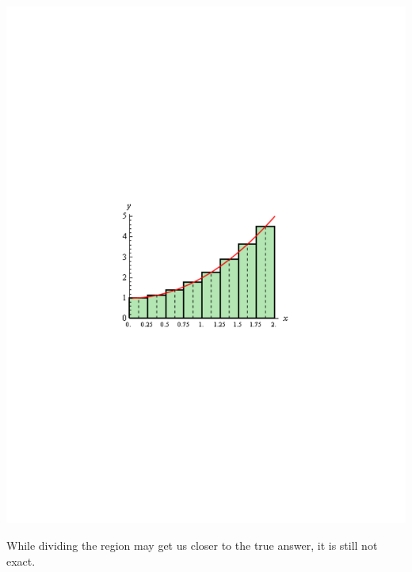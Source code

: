 \documentclass[11pt]{article}
\theoremstyle{definition}
\theoremstyle{remark}
\begin{document}
\begin{itemize}
\begin{center}
\includegraphics[scale=0.5]{img/integrals_moremidpoint.pdf}\\
\end{center}
While dividing the region may get us closer to the true answer, it is still not exact. 
\end{itemize}
\end{document}
